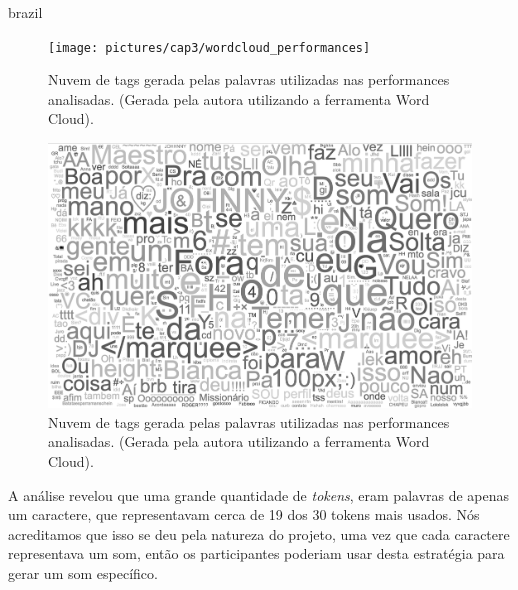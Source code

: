 \begin{otherlanguage*}{brazil}

\begin{figure}[ht!]
\centering
\texttt{[image: pictures/cap3/wordcloud\_performances]}
\caption{Nuvem de tags gerada pelas palavras utilizadas nas performances analisadas. (Gerada pela autora utilizando a ferramenta Word Cloud).}
\label{fig:clouds}
\end{figure}

\begin{figure}[ht!]
\centering
\includegraphics[width=1\linewidth]{pictures/cap3/wordcloud_pb}
\caption{Nuvem de tags gerada pelas palavras utilizadas nas performances analisadas. (Gerada pela autora utilizando a ferramenta Word Cloud).}
\label{fig:cloud}
\end{figure}

A análise revelou que uma grande quantidade de \emph{tokens}, eram palavras de apenas um caractere, que representavam cerca de 19 dos 30 tokens mais usados. Nós acreditamos que isso se deu pela natureza do projeto, uma vez que cada caractere representava um som, então os participantes poderiam usar desta estratégia para gerar um som específico. 


\end{otherlanguage*}
